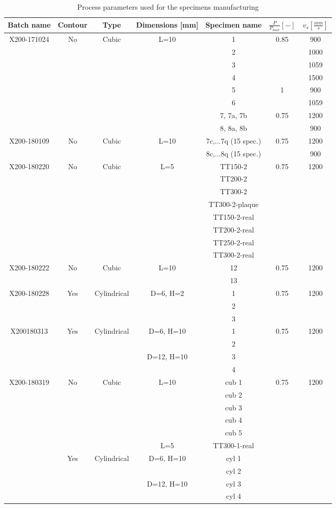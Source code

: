 \begin{table}[ht]
{\begin{tabular}{|c|c|c |c |c|c|c|}
    \hline
  Batch name & Contour & Type & Dimensions [mm] &Specimen name & $\frac{P}{P_{max}} [-]$ & $v_s [\frac{mm}{s}]$\\
  \hline
  \hline
  X200-171024 & No & Cubic & L=10& 1 & 0.85 & 900\\
  & &   & & 2 &  & 1000\\
  & &   & & 3&  & 1059\\
  & &  & & 4&  & 1500\\
  & &  & & 5& 1 & 900\\
  & &  & & 6&  & 1059\\
  & & & & 7, 7a, 7b & 0.75 & 1200\\
  & & & & 8, 8a, 8b& & 900\\
\hline  
  X200-180109 & No&Cubic & L=10 & 7c,...7q (15 spec.)& 0.75 &1200\\
  & & & & 8c,...8q (15 spec.)  & & 900\\
\hline  
  X200-180220 & No & Cubic & L=5 & TT150-2 & 0.75 & 1200\\
  & &  & & TT200-2 &  &\\
  & &  & & TT300-2 &  &\\
  & &  & & TT300-2-plaque &  &\\
  & &  & & TT150-2-real &  &\\
  & &  & & TT200-2-real &  &\\
  & &  & & TT250-2-real &  &\\
  & &  & & TT300-2-real &  &\\
\hline  
  X200-180222 & No & Cubic & L=10 &12& 0.75 & 1200\\
  & &  & &13 &  &\\
\hline  
  X200-180228  & Yes & Cylindrical & D=6, H=2 &1 & 0.75 & 1200\\
  & &  &  & 2&  & \\
  & &  &  & 3 &  & \\
\hline  
  X200180313 & Yes & Cylindrical & D=6, H=10&1& 0.75 & 1200\\
    & &    & &2 & &  \\
    & &  &D=12, H=10 &3& &  \\
    & & & &4 & & \\
\hline  
  X200-180319  & No & Cubic & L=10 & cub 1 & 0.75 & 1200\\
  & &  & & cub 2 & &\\
  & &  & & cub 3 & &\\
  & & & & cub 4 & &\\
  & & & & cub 5 & &\\
  & & &  L=5& TT300-1-real &  &\\ 
  & Yes &  Cylindrical & D=6, H=10&cyl 1   &  & \\
    & &  & &cyl 2 & & \\
    & &  & D=12, H=10 &cyl 3 & & \\
    & &  &  &cyl 4  & & \\

    \hline

\end{tabular}}
\caption[Process parameters used for the specimens manufacturing]{Process parameters used for the specimens manufacturing}
\label{table:Pparam}
\end{table}
